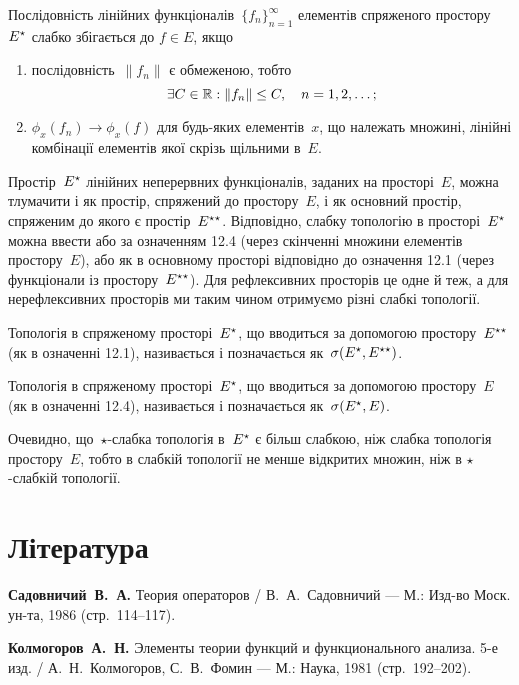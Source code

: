 \begin{theorem}
Послідовність лінійних функціоналів~$\{f_n\}_{n = 1}^\infty$
елементів спряженого простору~$E^\star$ слабко збігається до
$f \in E$, якщо
\begin{enumerate}
\item послідовність~$\|f_n\|$ є обмеженою, тобто
\begin{equation*}
\exists C \in \mathbb{R}: \|f_n\| \le C, \quad n = 1, 2, \dots;
\end{equation*}
\item $\phi_x(f_n) \to \phi_x(f)$ для будь-яких елементів~$x$, що
належать множині, лінійні комбінації елементів якої скрізь
щільними в~$E$.
\end{enumerate}
\end{theorem}

\begin{remark}
Простір~$E^\star$ лінійних неперервних функціоналів, заданих
на просторі~$E$, можна тлумачити і як простір, спряжений до
простору~$E$, і як основний простір, спряженим до якого є
простір~$E^{\star\star}$. Відповідно, слабку топологію в просторі~$E^\star$
можна ввести або за \error означенням 12.4 (через скінченні
множини елементів простору~$E$), або як в основному
просторі відповідно до \error означення 12.1 (через функціонали із
простору~$E^{\star\star}$). Для рефлексивних просторів це одне й теж, а
для нерефлексивних просторів ми таким чином отримуємо
різні слабкі топології.
\end{remark}

\begin{definition}
Топологія в спряженому просторі~$E^\star$, що
вводиться за допомогою простору~$E^{\star\star}$ (як в означенні 12.1),
називається  і позначається як~$\sigma(E^\star, E^{\star\star})$.
\end{definition}

\begin{definition}
Топологія в спряженому просторі~$E^\star$, що
вводиться за допомогою простору~$E$ (як в означенні 12.4),
називається  і позначається як~$\sigma(E^\star, E)$.
\end{definition}

\begin{remark}
Очевидно, що~$\star$-слабка топологія в~$E^\star$ є
більш слабкою, ніж слабка топологія простору~$E$, тобто в
слабкій топології не менше відкритих множин, ніж в
$\star$-слабкій топології.
\end{remark}

\section{Література}

\begin{enumerate}[label={[\arabic*]}]
\item \textbf{Садовничий~В.~А.}
Теория операторов /
В.~А.~Садовничий ---
М.: Изд-во Моск. ун-та, 1986 (стр.~114--117).
\item \textbf{Колмогоров~А.~Н.}
Элементы теории функций и функционального анализа. 5-е изд. /
А.~Н.~Колмогоров, С.~В.~Фомин ---
М.: Наука, 1981 (стр.~192--202).
\end{enumerate}
